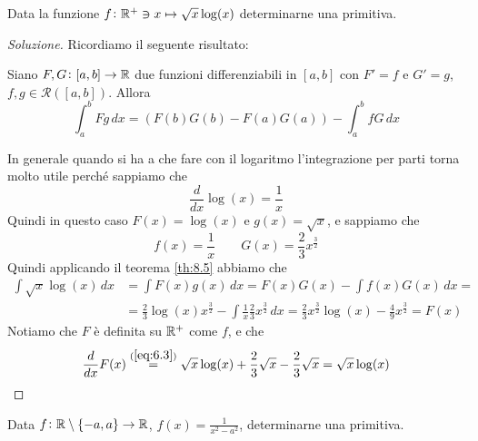 \begin{exercise}
    \label{ex:8.4}
    Data la funzione $f\colon \amsbb{R}^+\ni x \mapsto \sqrt{x}\log(x)$ determinarne una primitiva.
\end{exercise}
\begin{proof}[Soluzione]
    Ricordiamo il seguente risultato:
    \begin{tcolorbox}
        \begin{theorem}
            \label{th:8.5}
            Siano $F,G\colon [a,b]\to \amsbb{R}$ due funzioni differenziabili in $[a,b]$ con $F'=f$ e $G' = g$, $f,g\in\mathscr{R}([a,b])$. Allora
            \[
            \int_a^b Fg\,dx = \left(F(b)G(b)-F(a)G(a)\right)-\int_a^b fG\, dx
            \]
        \end{theorem}
    \end{tcolorbox}
    In generale quando si ha a che fare con il logaritmo l'integrazione per parti torna molto utile perché sappiamo che
    \[
    \frac{d}{dx}\log(x) = \frac{1}{x}
    \]
    Quindi in questo caso $F(x) = \log(x)$ e $g(x)=\sqrt{x}$, e sappiamo che
    \[
    f(x) = \frac{1}{x} \qquad G(x) = \frac{2}{3}x^{\frac{3}{2}}
    \]
    Quindi applicando il teorema \ref{th:8.5} abbiamo che
    \[
    \begin{split}
        \int \sqrt{x}\log(x)\, dx & = \int F(x)g(x)\, dx = F(x)G(x)-\int f(x)G(x)\, dx = \\
        & = \frac{2}{3}\log(x)x^{\frac{3}{2}}-\int \frac{1}{x}\frac{2}{3}x^{\frac{3}{2}}\, dx = \frac{2}{3}x^{\frac{3}{2}}\log(x)-\frac{4}{9}x^{\frac{3}{2}} = F(x)
    \end{split}
    \]
    Notiamo che $F$ è definita su $\amsbb{R}^+$ come $f$, e che
    \[
    \frac{d}{dx}F(x) \overset{(\ref{eq:6.3})}{=} \sqrt{x}\log(x)+\frac{2}{3}\sqrt{x} -\frac{2}{3}\sqrt{x} = \sqrt{x}\log(x) 
    \]
\end{proof}
\begin{exercise}
    \label{ex:8.5}
    Data $f\colon \amsbb{R}\setminus\{-a, a\}\to \amsbb{R}$, $f(x) = \frac{1}{x^2-a^2}$, determinarne una primitiva.
\end{exercise}
